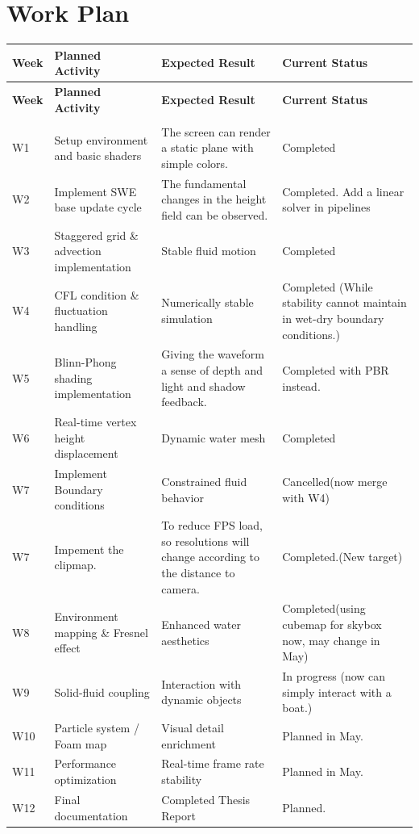 \documentclass[12pt,a4paper]{article}
\begin{document}
\section*{Work Plan}
\renewcommand{\arraystretch}{1.2}
\begin{longtable}{>{\centering\arraybackslash}p{1cm} p{4.5cm} p{6cm} p{2.8cm}}
\toprule
\textbf{Week} & \textbf{Planned Activity} & \textbf{Expected Result} & \textbf{Current Status} \\
\midrule
\endfirsthead

\toprule
\textbf{Week} & \textbf{Planned Activity} & \textbf{Expected Result} & \textbf{Current Status} \\
\midrule
\endhead

\midrule
\multicolumn{4}{r}{\small Continued on next page} \\
\endfoot

\bottomrule
\endlastfoot

W1 & Setup environment and basic shaders & The screen can render a static plane with simple colors. & Completed \\
W2 & Implement SWE base update cycle & The fundamental changes in the height field can be observed. & Completed. Add a linear solver in pipelines \\
W3 & Staggered grid \& advection implementation & Stable fluid motion & Completed \\
W4 & CFL condition \& fluctuation handling & Numerically stable simulation & Completed (While stability cannot maintain in wet-dry boundary conditions.) \\
W5 & Blinn-Phong shading implementation & Giving the waveform a sense of depth and light and shadow feedback. & Completed with PBR instead. \\
W6 & Real-time vertex height displacement & Dynamic water mesh & Completed\\
W7 & Implement Boundary conditions & Constrained fluid behavior & Cancelled(now merge with W4) \\
W7 & Impement the clipmap. &To reduce FPS load, so resolutions will change according to the distance to camera. & Completed.(New target) \\
W8 & Environment mapping \& Fresnel effect & Enhanced water aesthetics & Completed(using cubemap for skybox now, may change in May) \\
W9 & Solid-fluid coupling & Interaction with dynamic objects & In progress (now can simply interact with a boat.) \\
W10 & Particle system / Foam map & Visual detail enrichment & Planned in May.\\
W11 & Performance optimization & Real-time frame rate stability & Planned in May. \\
W12 & Final documentation & Completed Thesis Report & Planned.\\
\end{longtable}
\end{document}
